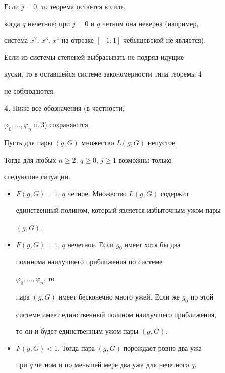  


\begin{note} Если $j=0$, то теорема остается в силе, 


когда $q$ нечетное; при $j=0$ и $q$ четном она неверна (например, 


система $x^2$, $x^3$, $x^4$ на отрезке $[-1,1]$ чебышевской не является). 


\end{note} 


 


\begin{note} Если из системы степеней выбрасывать не подряд идущие 


куски, то в оставшейся системе закономерности типа теоремы 4 


не соблюдаются. 


\end{note} 


 


{\bf 4.} Ниже все обозначения (в частности, 


$\varphi_0,\dotsc,\varphi_n$ п.\,3) сохраняются. 


 


\begin{thm} Пусть для пары $(g,G)$ множество $L(g,G)$ непустое. 


Тогда для любых $n\ge 2$, $q\ge 0$, $j\ge 1$ возможны только


следующие ситуации. 


\begin{itemize} 


\item[1)] $F(g,G)=1$, $q$ четное. Множество $L(g,G)$ содержит 


единственный полином, который является избыточным ужом пары 


$(g,G)$. 


\item[2)] $F(g,G)=1$, $q$ нечетное. Если $g_0$ имеет хотя бы два 


полинома наилучшего приближения по системе


$\varphi_0,\dotsc,\varphi_n$, то 


пара $(g,G)$ имеет бесконечно много ужей. Если же $g_0$ по этой 


системе имеет единственный полином наилучшего приближения, 


то он и будет единственным ужом пары $(g,G)$. 


\item[3)] $F(g,G)<1$. Тогда пара $(g,G)$ порождает ровно два ужа 


при $q$ четном и по меньшей мере два ужа для нечетного $q$. 


\end{itemize} 


\end{thm} 


